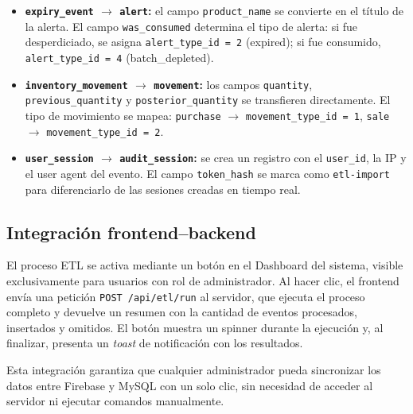\documentclass[journal]{IEEEtran}
\begin{document}
	\begin{itemize}[leftmargin=*, label=\textbullet, itemsep=2pt]
		\item \textbf{\texttt{expiry\_event} $\rightarrow$ \texttt{alert}:}
		el campo \texttt{product\_name} se convierte en el
		t\'{i}tulo de la alerta. El campo \texttt{was\_consumed}
		determina el tipo de alerta: si fue desperdiciado, se
		asigna \texttt{alert\_type\_id = 2} (expired); si fue
		consumido, \texttt{alert\_type\_id = 4} (batch\_depleted).
		
		\item \textbf{\texttt{inventory\_movement} $\rightarrow$
			\texttt{movement}:} los campos \texttt{quantity},
		\texttt{previous\_quantity} y \texttt{posterior\_quantity}
		se transfieren directamente. El tipo de movimiento se
		mapea: \texttt{purchase} $\rightarrow$ \texttt{movement\_type\_id = 1},
		\texttt{sale} $\rightarrow$ \texttt{movement\_type\_id = 2}.
		
		\item \textbf{\texttt{user\_session} $\rightarrow$
			\texttt{audit\_session}:} se crea un registro con
		el \texttt{user\_id}, la IP y el user agent del evento.
		El campo \texttt{token\_hash} se marca como
		\texttt{etl-import} para diferenciarlo de las sesiones
		creadas en tiempo real.
	\end{itemize}
	
	\subsection{Integraci\'{o}n frontend--backend}
	\label{subsec:etl-frontend}
	
	El proceso ETL se activa mediante un bot\'{o}n en el
	Dashboard del sistema, visible exclusivamente para usuarios
	con rol de administrador. Al hacer clic, el frontend
	env\'{i}a una petici\'{o}n \texttt{POST /api/etl/run} al
	servidor, que ejecuta el proceso completo y devuelve un
	resumen con la cantidad de eventos procesados, insertados y
	omitidos. El bot\'{o}n muestra un spinner durante la
	ejecuci\'{o}n y, al finalizar, presenta un
	\textit{toast} de notificaci\'{o}n con los resultados.
	
	Esta integraci\'{o}n garantiza que cualquier administrador
	pueda sincronizar los datos entre Firebase y MySQL con un
	solo clic, sin necesidad de acceder al servidor ni ejecutar
	comandos manualmente.
	
\end{document}
